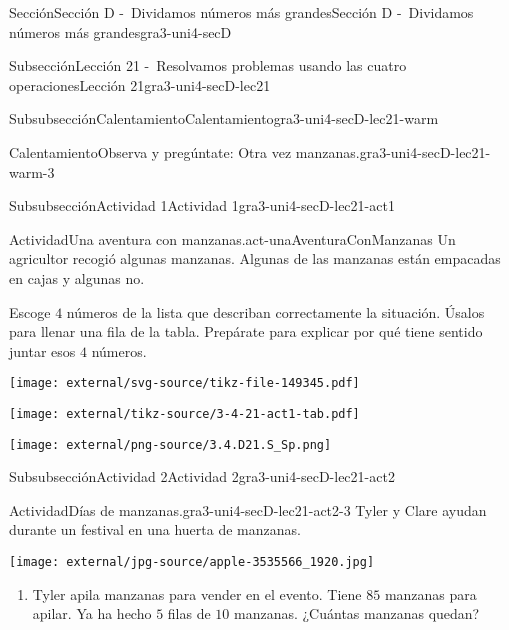 \documentclass[twoside,14pt,]{extarticle}
\begin{document}
\begin{sectionptx}{Sección}{Sección D -~Dividamos números más grandes}{}{Sección D -~Dividamos números más grandes}{}{}{gra3-uni4-secD}
\begin{subsectionptx}{Subsección}{Lección 21 -~Resolvamos problemas usando las cuatro operaciones}{}{Lección 21}{}{}{gra3-uni4-secD-lec21}
\begin{subsubsectionptx}{Subsubsección}{Calentamiento}{}{Calentamiento}{}{}{gra3-uni4-secD-lec21-warm}
\begin{exploration}{Calentamiento}{Observa y pregúntate: Otra vez manzanas.}{gra3-uni4-secD-lec21-warm-3}
\end{exploration}%
\end{subsubsectionptx}
%
%
\typeout{************************************************}
\typeout{************************************************}
%
\begin{subsubsectionptx}{Subsubsección}{Actividad 1}{}{Actividad 1}{}{}{gra3-uni4-secD-lec21-act1}
\begin{activity}{Actividad}{Una aventura con manzanas.}{act-unaAventuraConManzanas}%
Un agricultor recogió algunas manzanas. Algunas de las manzanas están empacadas en cajas y algunas no.%
\par
Escoge \(4\) números de la lista que describan correctamente la situación. Úsalos para llenar una fila de la tabla. Prepárate para explicar por qué tiene sentido juntar esos \(4\) números.%
\begin{image}{0}{1}{0}{}%
\texttt{[image: external/svg-source/tikz-file-149345.pdf]}
\end{image}%
\begin{image}{0}{1}{0}{}%
\texttt{[image: external/tikz-source/3-4-21-act1-tab.pdf]}
\end{image}%
\begin{image}{0.25}{0.5}{0.25}{}%
\texttt{[image: external/png-source/3.4.D21.S\_Sp.png]}
\end{image}%
\end{activity}%
\end{subsubsectionptx}
%
%
\typeout{************************************************}
\typeout{************************************************}
%
\begin{subsubsectionptx}{Subsubsección}{Actividad 2}{}{Actividad 2}{}{}{gra3-uni4-secD-lec21-act2}
\begin{activity}{Actividad}{Días de manzanas.}{gra3-uni4-secD-lec21-act2-3}%
Tyler y Clare ayudan durante un festival en una huerta de manzanas.%
\begin{image}{0.25}{0.5}{0.25}{}%
\texttt{[image: external/jpg-source/apple-3535566\_1920.jpg]}
\end{image}%
%
\begin{enumerate}
\item{}Tyler apila manzanas para vender en el evento. Tiene \(85\) manzanas para apilar. Ya ha hecho \(5\) filas de \(10\) manzanas. ¿Cuántas manzanas quedan?%

\end{enumerate}
\end{activity}
\end{subsubsectionptx}
\end{subsectionptx}
\end{sectionptx}
\end{document}
